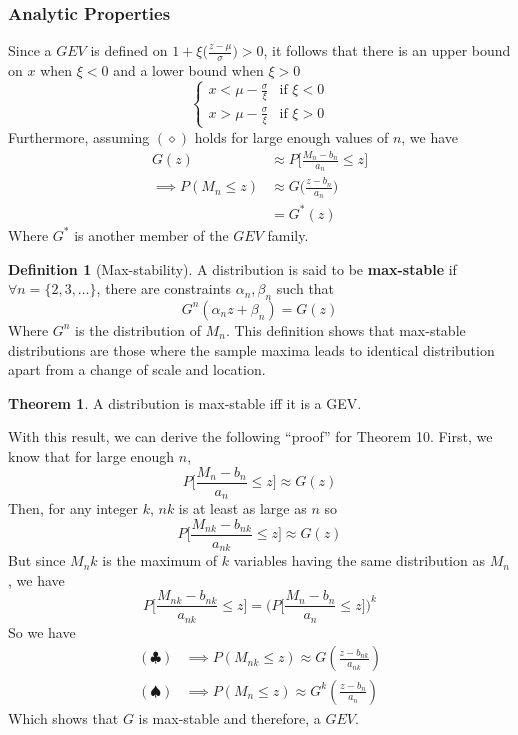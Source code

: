 \documentclass{article}
\theoremstyle{definition}
\newtheorem{theorem}{Theorem}
\theoremstyle{definition}
\newtheorem{definition}{Definition}
\begin{document}
\subsubsection{Analytic Properties}
Since a $GEV$ is defined on $1+\xi \bigg(\frac{z-\mu}{\sigma}\bigg)>0$, it follows that there is an upper bound on $x$ when $\xi<0$ and a lower bound when $\xi>0$
\[\begin{cases}
x < \mu-\frac{\sigma}{\xi}& \text{if }\xi<0\\
x > \mu-\frac{\sigma}{\xi}& \text{if }\xi>0
\end{cases}\]
Furthermore, assuming $(\diamond)$ holds for large enough values of $n$, we have 
\begin{align*}
    G(z)&\approx P \bigg[\frac{M_n-b_n}{a_n}\leq z \bigg]\\
    \implies P(M_n\leq z)& \approx G\bigg(\frac{z-b_n}{a_n}\bigg)\\
    &=G^*(z)
\end{align*}
Where $G^*$ is another member of the $GEV$ family.
\begin{definition}[Max-stability] A distribution is said to be \textbf{max-stable} if $\forall n=\{2,3,\hdots\}$, there are constraints $\alpha_n,\beta_n$ such that 
\[G^n(\alpha_nz+\beta_n)=G(z)\]
Where $G^n$ is the distribution of $M_n$. This definition shows that max-stable distributions are those where the sample maxima leads to identical distribution apart from a change of scale and location. 

\end{definition}
\begin{theorem}
A distribution is max-stable iff it is a GEV.
\end{theorem}
\noindent With this result, we can derive the following ``proof'' for Theorem 10. First, we know that for large enough $n$,
\[P\bigg[\frac{M_n-b_n}{a_n}\leq z \bigg]  \approx G(z)\]
Then, for any integer $k$, $nk$ is at least as large as $n$ so
\[P\bigg[\frac{M_{nk}-b_{nk}}{a_{nk}}\leq z \bigg]  \approx G(z) \tag{$\clubsuit$}\]
But since $M_nk$ is the maximum of $k$ variables having the same distribution as $M_n$, we have
\[P\bigg[\frac{M_{nk}-b_{nk}}{a_{nk}}\leq z \bigg] =\bigg( P\bigg[\frac{M_n-b_n}{a_n}\leq z \bigg]\bigg)^k \tag{$\spadesuit$}\]
So we have
\begin{align*}
    (\clubsuit)&\implies P(M_{nk}\leq z)\approx G(\frac{z-b_{nk}}{a_{nk}})\\
    (\spadesuit)&\implies P(M_{n}\leq z)\approx G^k(\frac{z-b_n}{a_n})
\end{align*}
Which shows that $G$ is max-stable and therefore, a $GEV$.
\end{document}
